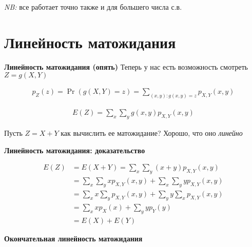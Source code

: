 \documentclass[12pt]{article}
\begin{document}
  \emph{NB:} все работает точно также и для большего числа с.в.


\section{Линейность матожидания}

  \textbf{Линейность матожидания (опять)}
  Теперь у нас есть возможность смотреть \emph{$Z = g(X, Y)$}
  
  \begin{align*}
    p_Z(z) = \Pr(g(X, Y) = z) = \sum_{(x, y): g(x, y) = z} p_{X, Y}(x, y)
  \end{align*}
  
  \begin{align*}
    E(Z) = \sum_x \sum_y g(x, y) p_{X, Y}(x, y)
  \end{align*}

  
  Пусть $Z = X + Y$ как вычислить ее матожидание? Хорошо, что оно \emph{линейно}

  \begin{center}
  \end{center}



  \textbf{Линейность матожидания: доказательство}

  \begin{align*}
    E(Z) &= E(X + Y) = \sum_x \sum_y (x + y) p_{X, Y}(x, y) \\
         &= \sum_x \sum_y x  p_{X, Y}(x, y) + \sum_x \sum_y  y p_{X, Y}(x, y) \\
         &= \sum_x x \sum_y p_{X, Y}(x, y) + \sum_y y \sum_x p_{X, Y}(x, y) \\
         &= \sum_x x p_X(x) + \sum_y y p_Y(y) \\
         &= E(X) + E(Y)
  \end{align*}



  \textbf{Окончательная линейность матожидания}

  \begin{center}
  \end{center}
\end{document}
